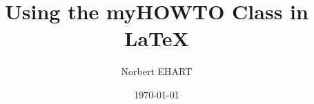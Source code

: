 \documentclass[]{myHOWTO-V1}
\title{Using the myHOWTO Class in \LaTeX}
\author{Norbert EHART}
\date{\today}
\begin{document}
	
\layout
	



\end{document}
